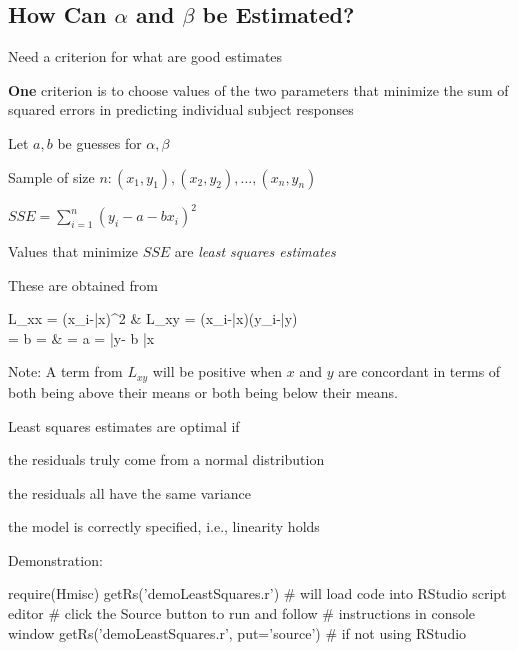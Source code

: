 \subsection{How Can $\alpha$ and $\beta$ be Estimated?}
\bi
\item Need a criterion for what are good estimates
\item \textbf{One} criterion is to choose values of the two parameters
  that minimize the sum of squared errors in predicting individual
  subject responses
\item Let $a, b$ be guesses for $\alpha, \beta$
\item Sample of size $n: (x_{1}, y_{1}), (x_{2}, y_{2}), \ldots,
  (x_{n},y_{n})$
\item $SSE = \sum_{i=1}^{n} (y_{i} - a - b x_{i})^2$
\item Values that minimize $SSE$ are \emph{least squares estimates}
\item These are obtained from

\ipacue\beqa
L_{xx} = \sum(x_{i}-\bar{x})^2 & L_{xy} = \sum(x_{i}-\bar{x})(y_{i}-\bar{y}) \\
\hat{\beta} = b =  &   \hat{\alpha} = a =
\bar{y}- b \bar{x}
\eeqa
\item Note: A term from $L_{xy}$ will be positive when $x$ and $y$ are
  concordant in terms of both being above their means or both being
  below their means.
\item Least squares estimates are optimal if
 \be
 \item the residuals truly come from a normal distribution
 \item the residuals all have the same variance
 \item the model is correctly specified, i.e., linearity holds
 \ee
\item Demonstration:
\begin{Schunk}
\begin{Sinput}
require(Hmisc)
getRs('demoLeastSquares.r')  # will load code into RStudio script editor
                             # click the Source button to run and follow
                             # instructions in console window
getRs('demoLeastSquares.r', put='source')   # if not using RStudio
\end{Sinput}
\end{Schunk}
\ei

